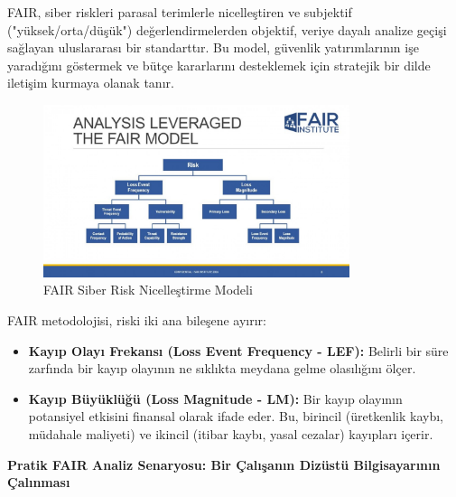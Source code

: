 FAIR, siber riskleri parasal terimlerle nicelleştiren ve subjektif ("yüksek/orta/düşük") değerlendirmelerden objektif, veriye dayalı analize geçişi sağlayan uluslararası bir standarttır. Bu model, güvenlik yatırımlarının işe yaradığını göstermek ve bütçe kararlarını desteklemek için stratejik bir dilde iletişim kurmaya olanak tanır.

\begin{figure}[H]
    \centering
    \includegraphics[width=0.8\textwidth]{img/FAIR-Cyber-Risk-Quantification-model.png}
    \caption{FAIR Siber Risk Nicelleştirme Modeli}
    \label{fig:fair-risk-model}
\end{figure}

FAIR metodolojisi, riski iki ana bileşene ayırır:
\begin{itemize}
    \item \textbf{Kayıp Olayı Frekansı (Loss Event Frequency - LEF):} Belirli bir süre zarfında bir kayıp olayının ne sıklıkta meydana gelme olasılığını ölçer.
    \item \textbf{Kayıp Büyüklüğü (Loss Magnitude - LM):} Bir kayıp olayının potansiyel etkisini finansal olarak ifade eder. Bu, birincil (üretkenlik kaybı, müdahale maliyeti) ve ikincil (itibar kaybı, yasal cezalar) kayıpları içerir.
\end{itemize}

\textbf{Pratik FAIR Analiz Senaryosu: Bir Çalışanın Dizüstü Bilgisayarının Çalınması}

